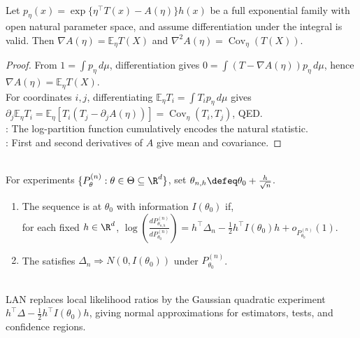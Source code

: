 \begin{proposition} \label{prop:exponential-family-moments} \\
Let $p_\eta(x)=\exp\{\eta^\top T(x)-A(\eta)\}h(x)$ be a full exponential family with open natural parameter space, and assume differentiation under the integral is valid. Then $\nabla A(\eta)=\mathbb{E}_\eta T(X)$ and $\nabla^2A(\eta)=\operatorname{Cov}_\eta(T(X))$.
\begin{proof} From $1=\int p_\eta\,d\mu$, differentiation gives $0=\int(T-\nabla A(\eta))p_\eta\,d\mu$, hence $\nabla A(\eta)=\mathbb{E}_\eta T(X)$.\\
For coordinates $i,j$, differentiating $\mathbb{E}_\eta T_i=\int T_ip_\eta\,d\mu$ gives $\partial_j\mathbb{E}_\eta T_i=\mathbb{E}_\eta[T_i(T_j-\partial_jA(\eta))]=\operatorname{Cov}_\eta(T_i,T_j)$, QED.\\
: The log-partition function cumulatively encodes the natural statistic.\\
: First and second derivatives of $A$ give mean and covariance.
\end{proof}
\end{proposition}

\begin{definition} \label{def:local-asymptotic-normality} \\
For experiments $\{P_\theta^{(n)}:\theta\in\Theta\subseteq\R^d\}$, set $\theta_{n,h}\defeq\theta_0+\frac{h}{\sqrt{n}}$.
\begin{enumerate}[label=(\roman*)]
\setlength{\itemsep}{0pt}
\item The sequence is  at $\theta_0$ with information $I(\theta_0)$ if,\\
for each fixed $h\in\R^d$, $\log(\frac{dP_{\theta_{n,h}}^{(n)}}{dP_{\theta_0}^{(n)}})=h^\top\Delta_n-\frac{1}{2}h^\top I(\theta_0)h+o_{P_{\theta_0}^{(n)}}(1)$.
\item The  satisfies $\Delta_n\Rightarrow N(0,I(\theta_0))$ under $P_{\theta_0}^{(n)}$.
\end{enumerate}
\end{definition}

\begin{remark} \label{rem:lan-bridge-to-estimation-tests} \\
LAN replaces local likelihood ratios by the Gaussian quadratic experiment $h^\top\Delta-\frac{1}{2}h^\top I(\theta_0)h$, giving normal approximations for estimators, tests, and confidence regions.
\end{remark}
